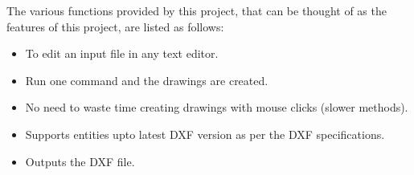 The various functions provided by this project, that can be thought of as the features of this project, are listed as follows:

\begin{itemize}
	\item To edit an input file in any text editor.
	\item Run one command and the drawings are created.
	\item No need to waste time creating drawings with mouse clicks (slower methods).
	\item Supports entities upto latest DXF version as per the DXF specifications.
	\item Outputs the DXF file.

\end{itemize}
